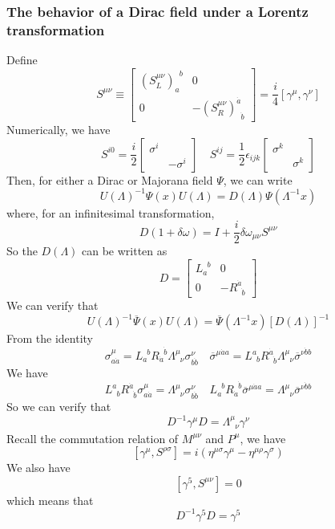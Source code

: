 \subsubsection{The behavior of a Dirac field under
a Lorentz transformation}
\noindent
Define
\[S^{\mu \nu} \equiv \left[ \begin{matrix} (S_L^{\mu\nu})_a^{\phantom{a}b}& 0\\ 0& -(S_R^{\mu\nu})^{\dot{a}}_{\phantom{\dot{a}} \dot{b}}\end{matrix} \right] = \frac{i}{4}[\gamma^{\mu},\gamma^{\nu}] \]
Numerically, we have
\[S^{i0} = \frac{i}{2} \left[ \begin{matrix} \sigma ^{i}& \\ & -\sigma ^{i}\end{matrix} \right] \quad S^{ij} = \frac{1}{2} \epsilon_{ijk} \left[ \begin{matrix} \sigma ^{k}& \\ & \sigma ^{k}\end{matrix} \right] \]
Then, for either a Dirac or Majorana field $\Psi$, we can write
\[U(\Lambda)^{-1} \Psi(x) U(\Lambda) = D(\Lambda) \Psi(\Lambda^{-1}x)\]
where, for an infinitesimal transformation,
\[D(1+\delta \omega) = I + \frac{i}{2} \delta \omega_{\mu \nu} S^{\mu \nu}\]
So the $D(\Lambda)$ can be written as
\[D = \left[ \begin{matrix} L_a^{\phantom{a}b}& 0\\ 0& -R^{\dot{a}}_{\phantom{\dot{a}} \dot{b}}\end{matrix} \right]  \]
We can verify that
\[U(\Lambda)^{-1} \overline{\Psi}(x) U(\Lambda) = \overline{\Psi}(\Lambda^{-1}x)[D(\Lambda)]^{-1} \]
From the identity
\[\sigma^{\mu}_{a\dot{a}} = L_a^{\phantom{a}b} R_{\dot{a}}^{\phantom{\dot{a}} \dot{b}} \Lambda^{\mu}_{\phantom{\mu} \nu} \sigma^{\nu}_{b\dot{b}} \quad \overline{\sigma}^{\mu \dot{a} a} = L^a_{\phantom{a}b} R^{\dot{a}}_{\phantom{\dot{a}} \dot{b}} \Lambda^{\mu}_{\phantom{\mu} \nu} \overline{\sigma}^{\nu\dot{b}b}\]
We have
\[L^a_{\phantom{a}b} R^{\dot{a}}_{\phantom{\dot{a}} \dot{b}} \sigma^{\mu}_{a\dot{a}} =  \Lambda^{\mu}_{\phantom{\mu} \nu} \sigma^{\nu}_{b\dot{b}} \quad L_a^{\phantom{a}b} R_{\dot{a}}^{\phantom{\dot{a}} \dot{b}} \overline{\sigma}^{\mu \dot{a} a} =  \Lambda^{\mu}_{\phantom{\mu} \nu} \overline{\sigma}^{\nu\dot{b}b}\]
So we can verify that
\[D^{-1} \gamma^{\mu} D = \Lambda^{\mu}_{\phantom{\mu} \nu} \gamma^{\nu}\]
Recall the commutation relation of $M^{\mu \nu}$ and $P^{\mu}$, we have
\[[\gamma^{\mu},S^{\rho \sigma}] = i(\eta^{\mu \sigma}\gamma^{\mu} - \eta^{\mu \rho}\gamma^{\sigma})\]
We also have
\[[\gamma^5,S^{\mu \nu}] = 0\]
which means that
\[D^{-1} \gamma^{5} D =  \gamma^{5}\]

